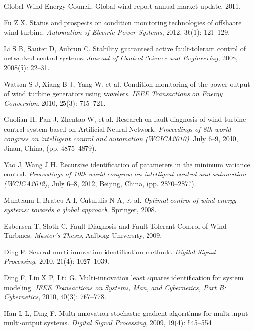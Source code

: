 \documentclass{article}
\begin{document}

\clearpage
\begin{thebibliography}{99}
Global Wind Energy Council. Global wind report-annual market update, 2011.

Fu Z X. Status and prospects on condition monitoring technologies of offshaore wind turbine. \emph{Automation of Electric Power Systems}, 2012, 36(1): 121--129.


Li S B, Sauter D, Aubrun C. Stability guaranteed active fault-tolerant control of networked control systems. \emph{Journal of Control Science and Engineering}, 2008, 2008(5): 22--31.

Watson S J, Xiang B J, Yang W, et al. Condition monitoring of the power output of wind turbine generators using wavelets. \emph{IEEE Transactions on Energy Conversion}, 2010, 25(3): 715--721.

Guolian H, Pan J, Zhentao W, et al. Research on fault diagnosis of wind turbine control system based on Artificial Neural Network. \emph{Proceedings of 8th world congress on intelligent control and automation (WCICA2010)}, July 6--9, 2010, Jinan, China, (pp. 4875--4879).

Yao J, Wang J H. Recursive identification of parameters in the minimum variance control. \emph{Proceedings of 10th world congress on intelligent control and automation (WCICA2012)}, July 6--8, 2012, Beijing, China, (pp. 2870--2877).

Munteanu I, Bratcu A I, Cutululis N A, et al. \emph{Optimal control of wind energy systems: towards a global approach}. Springer, 2008.


Esbensen T, Sloth C. Fault Diagnosis and Fault-Tolerant Control of Wind Turbines. \emph{Master's Thesis}, Aalborg University, 2009.

Ding F. Several multi-innovation identification methods. \emph{Digital Signal Processing}, 2010, 20(4): 1027--1039.

Ding F, Liu X P, Liu G. Multi-innovation least squares identification for system modeling. \emph{IEEE Transactions on Systems, Man, and Cybernetics, Part B: Cybernetics}, 2010, 40(3): 767--778.

Han L L, Ding F. Multi-innovation stochastic gradient algorithms for multi-input multi-output systems. \emph{Digital Signal Processing}, 2009, 19(4): 545--554


\end{thebibliography}
\end{document}

